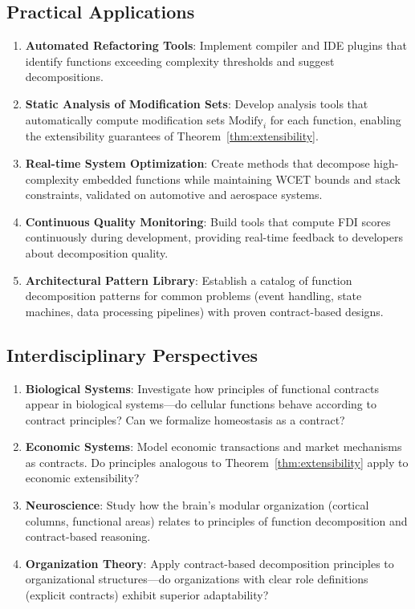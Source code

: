 \documentclass[a4paper,12pt]{article}
\theoremstyle{definition}
\begin{document}
\subsection{Practical Applications}

\begin{enumerate}
	\item \textbf{Automated Refactoring Tools}: Implement compiler and IDE plugins that identify functions exceeding complexity thresholds and suggest decompositions.
	
	\item \textbf{Static Analysis of Modification Sets}: Develop analysis tools that automatically compute modification sets $\mathrm{Modify}_i$ for each function, enabling the extensibility guarantees of Theorem~\ref{thm:extensibility}.
	
	\item \textbf{Real-time System Optimization}: Create methods that decompose high-complexity embedded functions while maintaining WCET bounds and stack constraints, validated on automotive and aerospace systems.
	
	\item \textbf{Continuous Quality Monitoring}: Build tools that compute FDI scores continuously during development, providing real-time feedback to developers about decomposition quality.
	
	\item \textbf{Architectural Pattern Library}: Establish a catalog of function decomposition patterns for common problems (event handling, state machines, data processing pipelines) with proven contract-based designs.
\end{enumerate}

\subsection{Interdisciplinary Perspectives}

\begin{enumerate}
	\item \textbf{Biological Systems}: Investigate how principles of functional contracts appear in biological systems—do cellular functions behave according to contract principles? Can we formalize homeostasis as a contract?
	
	\item \textbf{Economic Systems}: Model economic transactions and market mechanisms as contracts. Do principles analogous to Theorem~\ref{thm:extensibility} apply to economic extensibility?
	
	\item \textbf{Neuroscience}: Study how the brain's modular organization (cortical columns, functional areas) relates to principles of function decomposition and contract-based reasoning.
	
	\item \textbf{Organization Theory}: Apply contract-based decomposition principles to organizational structures—do organizations with clear role definitions (explicit contracts) exhibit superior adaptability?
\end{enumerate}
\end{document}
